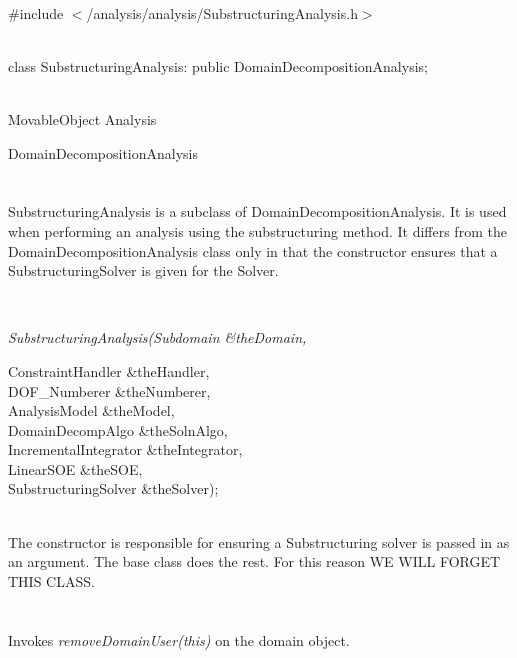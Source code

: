 
   \\
\#include $<$/analysis/analysis/SubstructuringAnalysis.h$>$  


  \\
class SubstructuringAnalysis: public DomainDecompositionAnalysis;  


 \\
\indent MovableObject
Analysis 

\indent\indent DomainDecompositionAnalysis \\
\indent\indent{} \\

 \\ 
\indent SubstructuringAnalysis is a subclass of DomainDecompositionAnalysis.
It is used when performing an analysis using the substructuring method.
It differs from the DomainDecompositionAnalysis class only in that the
constructor ensures that a SubstructuringSolver is given for the Solver.

 \\
{\em SubstructuringAnalysis(Subdomain \&theDomain, 

\indent\indent\indent\indent\indent\indent\indent ConstraintHandler \&theHandler, \\
\indent\indent\indent\indent\indent\indent\indent DOF\_Numberer \&theNumberer, \\
\indent\indent\indent\indent\indent\indent\indent AnalysisModel \&theModel,\\
\indent\indent\indent\indent\indent\indent\indent DomainDecompAlgo \&theSolnAlgo,\\
\indent\indent\indent\indent\indent\indent\indent IncrementalIntegrator \&theIntegrator,\\
\indent\indent\indent\indent\indent\indent\indent LinearSOE \&theSOE, \\
\indent\indent\indent\indent\indent\indent\indent SubstructuringSolver \&theSolver);} \\

The constructor is responsible for ensuring a Substructuring solver is
passed in as an argument. The base class does the rest. For this reason
WE WILL FORGET THIS CLASS. \\


 \\
\\ 
Invokes {\em removeDomainUser(this)} on the domain object. \\

\\

 \\













